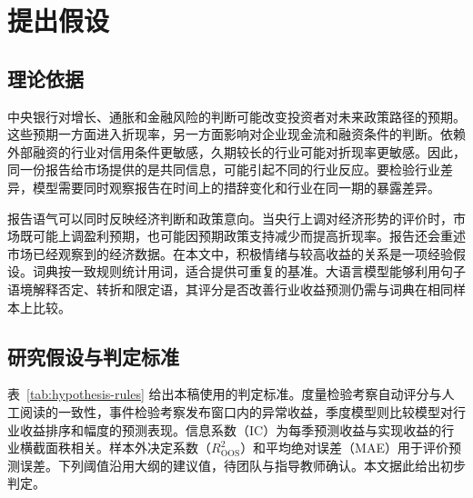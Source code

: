 \section{提出假设}
\label{sec:hypotheses}

\subsection{理论依据}

中央银行对增长、通胀和金融风险的判断可能改变投资者对未来政策路径的预期。这些预期一方面进入折现率，另一方面影响对企业现金流和融资条件的判断。依赖外部融资的行业对信用条件更敏感，久期较长的行业可能对折现率更敏感。因此，同一份报告给市场提供的是共同信息，可能引起不同的行业反应。要检验行业差异，模型需要同时观察报告在时间上的措辞变化和行业在同一期的暴露差异。

报告语气可以同时反映经济判断和政策意向。当央行上调对经济形势的评价时，市场既可能上调盈利预期，也可能因预期政策支持减少而提高折现率。报告还会重述市场已经观察到的经济数据。在本文中，积极情绪与较高收益的关系是一项经验假设。词典按一致规则统计用词，适合提供可重复的基准。大语言模型能够利用句子语境解释否定、转折和限定语，其评分是否改善行业收益预测仍需与词典在相同样本上比较。

\subsection{研究假设与判定标准}

表~\ref{tab:hypothesis-rules} 给出本稿使用的判定标准。度量检验考察自动评分与人工阅读的一致性，事件检验考察发布窗口内的异常收益，季度模型则比较模型对行业收益排序和幅度的预测表现。信息系数（IC）为每季预测收益与实现收益的行业横截面秩相关。样本外决定系数（$R^2_{\mathrm{OOS}}$）和平均绝对误差（MAE）用于评价预测误差。下列阈值沿用大纲的建议值，待团队与指导教师确认。本文据此给出初步判定。

